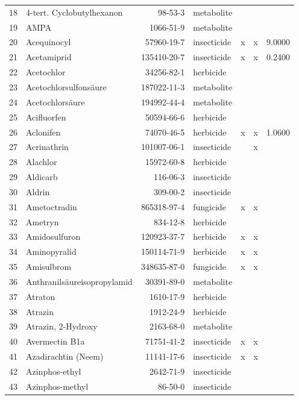 \begin{longtable}{lp{4cm}rlp{1.3cm}p{1.3cm}p{1.5cm}}
  18 & 4-tert. Cyclobutylhexanon & 98-53-3 & metabolite &  &  &  \\ 
  19 & AMPA & 1066-51-9 & metabolite &  &  &  \\ 
  20 & Acequinocyl & 57960-19-7 & insecticide & x & x & 9.0000 \\ 
  21 & Acetamiprid & 135410-20-7 & insecticide & x & x & 0.2400 \\ 
  22 & Acetochlor & 34256-82-1 & herbicide &  &  &  \\ 
  23 & Acetochlorsulfonsäure & 187022-11-3 & metabolite &  &  &  \\ 
  24 & Acetochlorsäure & 194992-44-4 & metabolite &  &  &  \\ 
  25 & Acifluorfen & 50594-66-6 & herbicide &  &  &  \\ 
  26 & Aclonifen & 74070-46-5 & herbicide & x & x & 1.0600 \\ 
  27 & Acrinathrin & 101007-06-1 & insecticide &  & x &  \\ 
  28 & Alachlor & 15972-60-8 & herbicide &  &  &  \\ 
  29 & Aldicarb & 116-06-3 & insecticide &  &  &  \\ 
  30 & Aldrin & 309-00-2 & insecticide &  &  &  \\ 
  31 & Ametoctradin & 865318-97-4 & fungicide & x & x &  \\ 
  32 & Ametryn & 834-12-8 & herbicide &  &  &  \\ 
  33 & Amidosulfuron & 120923-37-7 & herbicide & x & x &  \\ 
  34 & Aminopyralid & 150114-71-9 & herbicide & x & x &  \\ 
  35 & Amisulbrom & 348635-87-0 & fungicide & x & x &  \\ 
  36 & Anthranilsäureisopropylamid & 30391-89-0 & metabolite &  &  &  \\ 
  37 & Atraton & 1610-17-9 & herbicide &  &  &  \\ 
  38 & Atrazin & 1912-24-9 & herbicide &  &  &  \\ 
  39 & Atrazin, 2-Hydroxy & 2163-68-0 & metabolite &  &  &  \\ 
  40 & Avermectin B1a & 71751-41-2 & insecticide & x & x &  \\ 
  41 & Azadirachtin (Neem) & 11141-17-6 & insecticide & x & x &  \\ 
  42 & Azinphos-ethyl & 2642-71-9 & insecticide &  &  &  \\ 
  43 & Azinphos-methyl & 86-50-0 & insecticide &  &  &  \\ 

\end{longtable}
